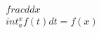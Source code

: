 \documentclass[preview]{standalone}
\begin{document}
\begin{align*}
\quad\\frac{d}{dx} \quad\\int_a^x f(t) dt = f(x)
\end{align*}
\end{document}

